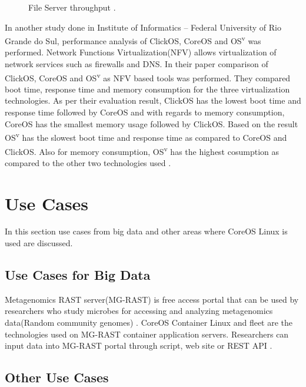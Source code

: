 \documentclass[9pt,twocolumn,twoside]{../../styles/osajnl}
\begin{document}
\begin{figure}[htbp]
\centering
{}
\caption{File Server throughput \cite{julian2016containers}. }
\label{fig:false-color}
\end{figure}

In another study done in Institute of Informatics – Federal University
of Rio Grande do Sul, performance analysis of ClickOS, CoreOS and
OS\textsuperscript{v} was performed. Network Functions
Virtualization(NFV) allows virtualization of network services such as
firewalls and DNS. In their paper comparison of ClickOS, CoreOS and
OS\textsuperscript{v} as NFV based tools was performed. They compared
boot time, response time and memory consumption for the three
virtualization technologies. As per their evaluation result, ClickOS
has the lowest boot time and response time followed by CoreOS and with
regards to memory consumption, CoreOS has the smallest memory usage
followed by ClickOS. Based on the result OS\textsuperscript{v} has the
slowest boot time and response time as compared to CoreOS and
ClickOS. Also for memory consumption, OS\textsuperscript{v} has the
highest cosumption as compared to the other two technologies used
\cite{2016NFVSolutions}.

\section{Use Cases}

In this section use cases from big data and other areas where CoreOS
Linux is used are discussed.

\subsection{Use Cases  for Big Data}

Metagenomics RAST server(MG-RAST) is free access portal that can be
used by researchers who study microbes for accessing and analyzing
metagenomics data(Random community genomes)
\cite{meyer2008metagenomics}. CoreOS Container Linux and fleet are
the technologies used on MG-RAST container application
servers. Researchers can input data into MG-RAST portal through
script, web site or REST API \cite{wilke2016mg}.

\subsection{Other Use Cases}
\end{document}
